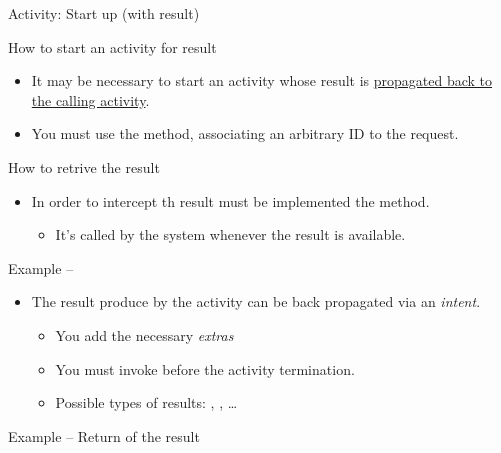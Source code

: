 \documentclass{beamer}
\begin{document}
  \begin{frame}{Activity: Start up (with result)}
    \begin{block}{How to start an activity for result}
    \begin{itemize}\itemsep10pt
      \item It may be necessary to start an activity whose result is \underline{propagated back to the calling activity}.
      \item You must use the  method, associating an arbitrary ID to the request.
    \end{itemize}
  \end{block}

  \begin{block}{How to retrive the result}
    \begin{itemize}\itemsep10pt
      \item In order to intercept th result must be implemented the  method.
      \begin{itemize}
        \item It's called by the system whenever the result is available.
      \end{itemize}
    \end{itemize}
  \end{block}

  \newpage
  \begin{exampleblock}{Example -- }
    
  \end{exampleblock}

  \begin{itemize}
    \item The result produce by the activity can be back propagated via an \textit{intent}.
    \begin{itemize}
      \item You add the necessary \textit{extras}
      \item You must invoke  before the activity termination.
      \item Possible types of results: , , \dots
    \end{itemize}
  \end{itemize}


  \begin{exampleblock}{Example -- Return of the result}
    
  \end{exampleblock}

\end{frame}
\end{document}
